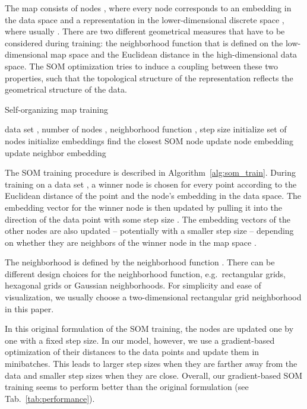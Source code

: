 \documentclass{article}
\begin{document}
The map consists of  nodes , where every node corresponds to an embedding in the data space  and a representation in the lower-dimensional discrete space , where usually .
There are two different geometrical measures that have to be considered during training: the neighborhood function  that is defined on the low-dimensional map space and the Euclidean distance  in the high-dimensional data space.
The SOM optimization tries to induce a coupling between these two properties, such that the topological structure of the representation reflects the geometrical structure of the data.


\begin{algorithm}
\caption{Self-organizing map training}
\label{alg:som_train}

\begin{algorithmic}
	\Require data set , number of nodes , neighborhood function , step size 
	\State initialize set of  nodes 
	\State initialize embeddings 
	\ForAll {}
		\State find the closest SOM node 
		\State update node embedding 
		\ForAll {}
			\State update neighbor embedding 
		\EndFor
	\EndFor
	\EndWhile
\end{algorithmic}
	
\end{algorithm}

The SOM training procedure is described in Algorithm~\ref{alg:som_train}.
During training on a data set , a winner node  is chosen for every point  according to the Euclidean distance of the point and the node's embedding in the data space.
The embedding vector for the winner node is then updated by pulling it into the direction of the data point with some step size .
The embedding vectors of the other nodes are also updated -- potentially with a smaller step size -- depending on whether they are neighbors of the winner node in the map space .

The neighborhood is defined by the neighborhood function .
There can be different design choices for the neighborhood function, e.g.\ rectangular grids, hexagonal grids or Gaussian neighborhoods.
For simplicity and ease of visualization, we usually choose a two-dimensional rectangular grid neighborhood in this paper.

In this original formulation of the SOM training, the nodes are updated one by one with a fixed step size.
In our model, however, we use a gradient-based optimization of their distances to the data points and update them in minibatches.
This leads to larger step sizes when they are farther away from the data and smaller step sizes when they are close.
Overall, our gradient-based SOM training seems to perform better than the original formulation (see Tab.~\ref{tab:performance}).
\end{document}
